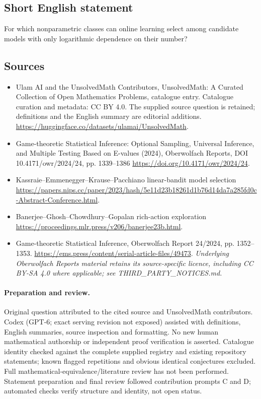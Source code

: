 \documentclass[11pt]{article}
\begin{document}
\subsection{Short English statement}
For which nonparametric classes can online learning select among candidate models with only logarithmic dependence on their number?
\subsection{Sources}
\begin{itemize}
\item[\hypertarget{source:statement:1}{S1}] Ulam AI and the UnsolvedMath Contributors, UnsolvedMath: A Curated Collection of Open Mathematics Problems, catalogue entry. Catalogue curation and metadata: CC BY 4.0. The supplied source question is retained; definitions and the English summary are editorial additions.
\url{https://huggingface.co/datasets/ulamai/UnsolvedMath}.
\item[\hypertarget{source:statement:2}{S2}] Game-theoretic Statistical Inference: Optional Sampling, Universal Inference, and Multiple Testing Based on E-values (2024), Oberwolfach Reports, DOI 10.4171/owr/2024/24, pp. 1339--1386
\url{https://doi.org/10.4171/owr/2024/24}.
\item[\hypertarget{source:statement:3}{S3}] Kassraie--Emmenegger--Krause--Pacchiano linear-bandit model selection
\url{https://papers.nips.cc/paper/2023/hash/5e11d23b18261d1b76d14da7a285fd0c-Abstract-Conference.html}.
\item[\hypertarget{source:statement:4}{S4}] Banerjee--Ghosh--Chowdhury--Gopalan rich-action exploration
\url{https://proceedings.mlr.press/v206/banerjee23b.html}.
\item[\hypertarget{source:statement:5}{S5}] Game-theoretic Statistical Inference, Oberwolfach Report 24/2024, pp. 1352--1353.
\url{https://ems.press/content/serial-article-files/49473}.
\textit{Underlying Oberwolfach Reports material retains its source-specific licence, including CC BY-SA 4.0 where applicable; see THIRD\_PARTY\_NOTICES.md.}
\end{itemize}
\paragraph{Preparation and review.}
Original question attributed to the cited source and UnsolvedMath contributors. Codex (GPT-6; exact serving revision not exposed) assisted with definitions, English summaries, source inspection and formatting. No new human mathematical authorship or independent proof verification is asserted. Catalogue identity checked against the complete supplied registry and existing repository statements; known flagged repetitions and obvious identical conjectures excluded. Full mathematical-equivalence/literature review has not been performed. Statement preparation and final review followed contribution prompts C and D; automated checks verify structure and identity, not open status.
\label{end:statement}
\end{document}
